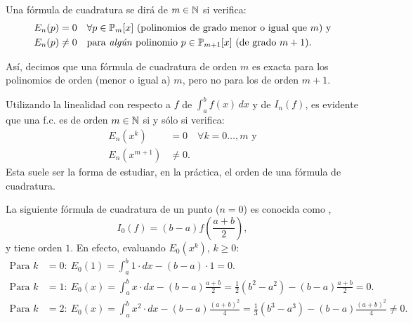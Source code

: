\begin{definition}
  \label{def:2}
  Una fórmula de cuadratura se dirá de  $m\in\operatorname{{\mathbb N}}$ si
  verifica:
  \begin{align*}
    E_n(p)&=0 \quad \forall p\in\operatorname{{\mathbb P}}_m[x] \text{ (polinomios
      de grado menor o igual que $m$) y}
    \\
    E_n(p)&\neq 0 \quad \text{para \emph{algún} polinomio }
    p\in\operatorname{{\mathbb P}}_{m+1}[x] \text{ (de grado $m+1$)}.
  \end{align*}
\end{definition}
Así, decimos que una fórmula de cuadratura de orden $m$ es exacta para
los polinomios de orden (menor o igual a) $m$, pero no para los de
orden $m+1$.
\begin{remark}
  \label{rk:5}
  Utilizando la linealidad con respecto a $f$ de $\int_a^bf(x)\,dx$ y
  de $I_n(f)$, es evidente que una f.c. es de orden $m\in\operatorname{{\mathbb N}}$ si
  y sólo si verifica:
  \begin{align*}
    E_n(x^k)&=0 \quad \forall k=0\dots,m \text{ y}
    \\
    E_n(x^{m+1})&\neq 0.
  \end{align*}
  Esta suele ser la forma de estudiar, en la práctica, el orden de una
  fórmula de cuadratura.
\end{remark}

\begin{example}
  \label{ex:formula-punto-medio}
  La siguiente fórmula de cuadratura de un punto ($n=0$) es conocida
  como ,
  \begin{equation}
    \label{eq:f.c.-pto-medio}
    I_0(f)= (b-a) f\left(\frac{a+b}{2}\right),
  \end{equation}
  y tiene orden $1$. En efecto, evaluando $E_0(x^k)$, $k\ge 0$:
  \begin{align*}
   \text{Para } k&=0:\ E_0(1) = \int_a^b 1\cdot dx - (b-a)\cdot 1 = 0.
   \\
   \text{Para } k&=1:\ E_0(x) = \int_a^b x\cdot dx - (b-a)\frac{a+b}{2}
   = \frac{1}{2}(b^2-a^2) -  (b-a) \frac{a+b}{2} = 0.
   \\
   \text{Para } k&=2:\ E_0(x) = \int_a^b x^2\cdot dx 
   - (b-a) \frac{(a+b)^2}{4} 
   = \frac{1}{3}(b^3-a^3) - (b-a)\frac{(a+b)^2}{4} 
   \neq 0.
  \end{align*}
\end{example}


